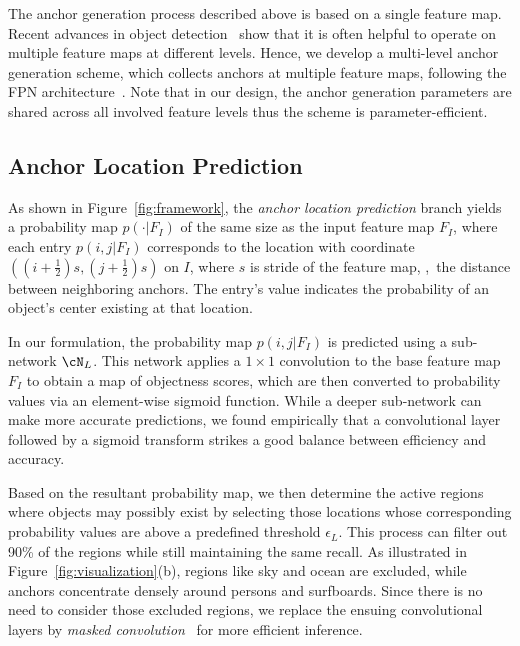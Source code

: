 \documentclass[10pt,twocolumn,letterpaper]{article}
\begin{document}
The anchor generation process described above is based on a single feature map.
Recent advances in object detection~\cite{lin2017feature,lin2017focal} show
that it is often helpful to operate on multiple feature maps at different levels.
Hence, we develop a multi-level anchor generation scheme, which collects
anchors at multiple feature maps, following the FPN architecture~\cite{lin2017feature}.
Note that in our design, the anchor generation parameters are shared
across all involved feature levels thus the scheme is parameter-efficient.

\subsection{Anchor Location Prediction}
\label{subsec:anchor-loc}

As shown in Figure~\ref{fig:framework}, the \emph{anchor location prediction}
branch yields a probability map $p(\cdot|F_I)$ of the same size as the input
feature map $F_I$, where each entry $p(i, j | F_I)$ corresponds to the location
with coordinate $((i + \frac{1}{2})s, (j + \frac{1}{2})s)$ on $I$, where $s$
is stride of the feature map, \ie,~the distance between neighboring anchors.
The entry's value
indicates the probability of an object's center existing at that location.

In our formulation, the probability map $p(i, j | F_I)$ is predicted using a sub-network $\cN_L$.
This network applies a $1 \times 1$ convolution to the base feature map $F_I$
to obtain a map of objectness scores, which are then converted to
probability values via an element-wise sigmoid function.
While a deeper sub-network can make more accurate predictions, we found
empirically that a convolutional layer followed by a sigmoid transform strikes
a good balance between efficiency and accuracy.

Based on the resultant probability map, we then determine the active regions
where objects may possibly exist by selecting those locations whose
corresponding probability values are above a predefined threshold $\epsilon_L$.
This process can filter out 90\% of the regions while still
maintaining the same recall.
As illustrated in Figure~\ref{fig:visualization}(b), regions like sky and ocean
are excluded, while anchors concentrate densely around persons and surfboards.
Since there is no need to consider those excluded regions, we replace the ensuing
convolutional layers by \emph{masked convolution}~\cite{li2017not,song2018beyond}
for more efficient inference.
\end{document}
